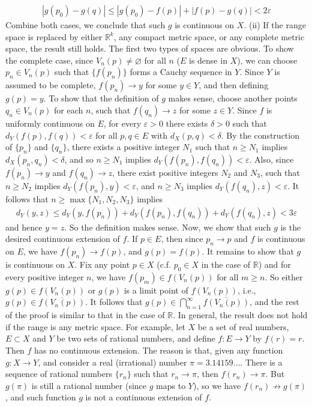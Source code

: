 \documentclass[12pt]{article}
\theoremstyle{definition}
\begin{document}
\begin{align*}
\left\vert g(p_0)-g(q)\right\vert
\le \left\vert g(p_0)-f(p)\right\vert+\left\vert f(p)-g(q)\right\vert
<2\varepsilon
\end{align*}
Combine both cases, we conclude that such $g$ is continuous on $X$.
(ii) If the range space is replaced by either $\mathbb{R}^k$, any compact metric space, or any complete metric space, the result still holds. The first two types of spaces are obvious. To show the complete case, since $V_n(p)\neq\varnothing$ for all $n$ ($E$ is dense in $X$), we can choose $p_n\in V_n(p)$ such that $\{f(p_n)\}$ forms a Cauchy sequence in $Y$. Since $Y$ is assumed to be complete, $f(p_n)\to y$ for some $y\in Y$, and then defining $g(p)=y$. To show that the definition of $g$ makes sense, choose another points $q_n\in V_n(p)$ for each $n$, such that $f(q_n)\to z$ for some $z\in Y$. Since $f$ is uniformly continuous on $E$, for every $\varepsilon>0$ there exists $\delta>0$ such that $d_Y(f(p),f(q))<\varepsilon$ for all $p,q\in E$ with $d_X(p,q)<\delta$. By the construction of $\{p_n\}$ and $\{q_n\}$, there exists a positive integer $N_1$ such that $n\ge N_1$ implies $d_X(p_n,q_n)<\delta$, and so $n\ge N_1$ implies $d_Y(f(p_n),f(q_n))<\varepsilon$. Also, since $f(p_n)\to y$ and $f(q_n)\to z$, there exist positive integers $N_2$ and $N_3$, such that $n\ge N_2$ implies $d_Y(f(p_n),y)<\varepsilon$, and $n\ge N_3$ implies $d_Y(f(q_n),z)<\varepsilon$. It follows that $n\ge\max\{N_1,N_2,N_3\}$ implies
\begin{align*}
d_Y(y,z)
\le d_Y(y,f(p_n))+d_Y(f(p_n),f(q_n))+d_Y(f(q_n),z)
<3\varepsilon
\end{align*}
and hence $y=z$. So the definition makes sense. Now, we show that such $g$ is the desired continuous extension of $f$. If $p\in E$, then since $p_n\to p$ and $f$ is continuous on $E$, we have $f(p_n)\to f(p)$, and $g(p)=f(p)$. It remains to show that $g$ is continuous on $X$. Fix any point $p\in X$ (c.f. $p_0\in X$ in the case of $\mathbb{R}$) and for every positive integer $n$, we have $f(p_m)\in f(V_n(p))$ for all $m\ge n$. So either $g(p)\in f(V_n(p))$ or $g(p)$ is a limit point of $f(V_n(p))$, i.e., $g(p)\in\overline{f(V_n(p))}$. It follows that $g(p)\in\bigcap_{n=1}^\infty\overline{f(V_n(p))}$, and the rest of the proof is similar to that in the case of $\mathbb{R}$.
In general, the result does not hold if the range is any metric space. For example, let $X$ be a set of real numbers, $E\subset X$ and $Y$ be two sets of rational numbers, and define $f:E\to Y$ by $f(r)=r$. Then $f$ has no continuous extension. The reason is that, given any function $g:X\to Y$, and consider a real (irrational) number $\pi=3.14159\ldots$. There is a sequence of rational numbers $\{r_n\}$ such that $r_n\to\pi$, then $f(r_n)\to\pi$. But $g(\pi)$ is still a rational number (since $g$ maps to $Y$), so we have $f(r_n)\not\to g(\pi)$, and such function $g$ is not a continuous extension of $f$.
\end{document}
